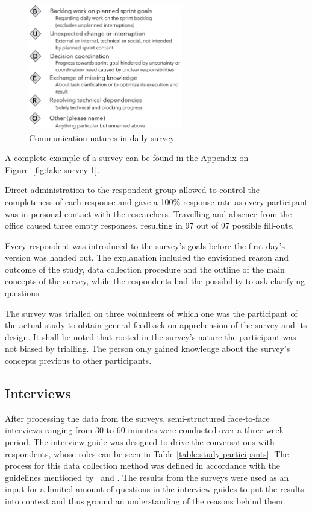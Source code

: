 \begin{figure}[h!]
  \centering
  \includegraphics[width=0.60\textwidth]{figures/fake-partial-nature.png}
  \caption{Communication natures in daily survey}
  \label{fig:survey-natures}
\end{figure}

A complete example of a survey can be found in the Appendix on Figure~\ref{fig:fake-survey-1}. 

Direct administration to the respondent group allowed to control the completeness of each response and gave a 100\% response rate as every participant was in personal contact with the researchers. Travelling and absence from the office caused three empty responses, resulting in 97 out of 97 possible fill-outs.

Every respondent was introduced to the survey's goals before the first day's version was handed out. The explanation included the envisioned reason and outcome of the study, data collection procedure and the outline of the main concepts of the survey, while the respondents had the possibility to ask clarifying questions.

The survey was trialled on three volunteers of which one was the participant of the actual study to obtain general feedback on apprehension of the survey and its design. It shall be noted that rooted in the survey's nature the participant was not biased by trialling. The person only gained knowledge about the survey's concepts previous to other participants.

\subsection{Interviews}

After processing the data from the surveys, semi-structured face-to-face interviews ranging from 30 to 60 minutes were conducted over a three week period. The interview guide was designed to drive the conversations with respondents, whose roles can be seen in Table \ref{table:study-participants}.
The process for this data collection method was defined in accordance with the guidelines mentioned by~\citet{runeson2012CaseStudyResearchInSE} and \citet{Myers2007ISinterview}. The results from the surveys were used as an input for a limited amount of questions in the interview guides to put the results into context and thus ground an understanding of the reasons behind them.

